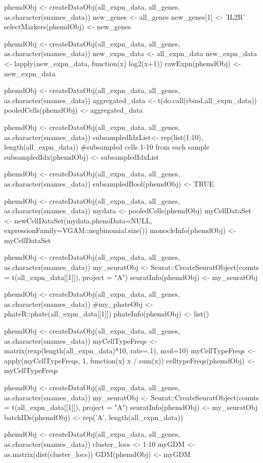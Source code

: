 \documentclass[a4paper]{book}
\begin{document}
%
\begin{Examples}
\begin{ExampleCode}
phemdObj <- createDataObj(all_expn_data, all_genes, as.character(snames_data))
new_genes <- all_genes
new_genes[1] <- 'IL2R'
selectMarkers(phemdObj) <- new_genes

phemdObj <- createDataObj(all_expn_data, all_genes, as.character(snames_data))
new_expn_data <- all_expn_data
new_expn_data <- lapply(new_expn_data, function(x) {log2(x+1)})
rawExpn(phemdObj) <- new_expn_data

phemdObj <- createDataObj(all_expn_data, all_genes, as.character(snames_data))
aggregated_data <- t(do.call(rbind,all_expn_data))
pooledCells(phemdObj) <- aggregated_data

phemdObj <- createDataObj(all_expn_data, all_genes, as.character(snames_data))
subsampledIdxList<- rep(list(1:10), length(all_expn_data)) #subsampled cells 1-10 from each sample
subsampledIdx(phemdObj) <- subsampledIdxList

phemdObj <- createDataObj(all_expn_data, all_genes, as.character(snames_data))
subsampledBool(phemdObj) <- TRUE

phemdObj <- createDataObj(all_expn_data, all_genes, as.character(snames_data))
mydata <- pooledCells(phemdObj)
myCellDataSet <- newCellDataSet(mydata,phenoData=NULL, expressionFamily=VGAM::negbinomial.size())
monocleInfo(phemdObj) <- myCellDataSet

phemdObj <- createDataObj(all_expn_data, all_genes, as.character(snames_data))
my_seuratObj <- Seurat::CreateSeuratObject(counts = t(all_expn_data[[1]]), project = "A")
seuratInfo(phemdObj) <- my_seuratObj

phemdObj <- createDataObj(all_expn_data, all_genes, as.character(snames_data))
#my_phateObj <- phateR::phate(all_expn_data[[1]])
phateInfo(phemdObj) <- list()

phemdObj <- createDataObj(all_expn_data, all_genes, as.character(snames_data))
myCellTypeFreqs <- matrix(rexp(length(all_expn_data)*10, rate=.1), ncol=10)
myCellTypeFreqs <- apply(myCellTypeFreqs, 1, function(x) {x / sum(x)})
celltypeFreqs(phemdObj) <- myCellTypeFreqs

phemdObj <- createDataObj(all_expn_data, all_genes, as.character(snames_data))
my_seuratObj <- Seurat::CreateSeuratObject(counts = t(all_expn_data[[1]]), project = "A")
seuratInfo(phemdObj) <- my_seuratObj
batchIDs(phemdObj) <- rep('A', length(all_expn_data))

phemdObj <- createDataObj(all_expn_data, all_genes, as.character(snames_data))
cluster_locs <- 1:10
myGDM <- as.matrix(dist(cluster_locs))
GDM(phemdObj) <- myGDM

\end{ExampleCode}
\end{Examples}
\end{document}
